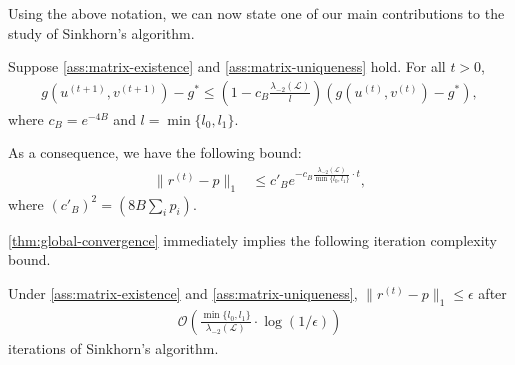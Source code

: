 Using the above notation, we can now state one of our main contributions to the study of Sinkhorn's algorithm. 
\begin{theorem}
\label{thm:global-convergence}
Suppose \cref{ass:matrix-existence} and \cref{ass:matrix-uniqueness} hold. For all $t>0$,
\begin{align}
\label{eq:potential convergence}
g(u^{(t+1)},v^{(t+1)}) - g^\ast \leq (1-c_B \frac{\lambda_{-2}(\mathcal{L})} {l})\left( g(u^{(t)},v^{(t)})-g^\ast \right),
    \end{align}
    where $c_B=e^{-4B}$ and $l=\min\{l_0,l_1\}$.
      
    As a consequence, we have the following bound:
    \begin{align*}
       \|r^{(t)}-p\|_{1} &\leq c'_Be^{-c_{B}\frac{\lambda_{-2}(\mathcal{L})}{\min\{l_{0},l_{1}\}}\cdot t},
    \end{align*} 
    where $(c'_B)^2=(8B\sum_{i}p_{i})$.
\end{theorem}
\cref{thm:global-convergence} immediately implies the following iteration complexity bound.
\begin{corollary}
Under \cref{ass:matrix-existence} and \cref{ass:matrix-uniqueness}, $\|r^{(t)}-p\|_1\leq \epsilon$ after
      \begin{align*}
          \mathcal{O} \left (\frac{\min\{l_{0},l_{1}\}}{\lambda_{-2}(\mathcal{L})} \cdot \log (1/\epsilon) \right )
      \end{align*}
       iterations of Sinkhorn's algorithm.
\end{corollary}

